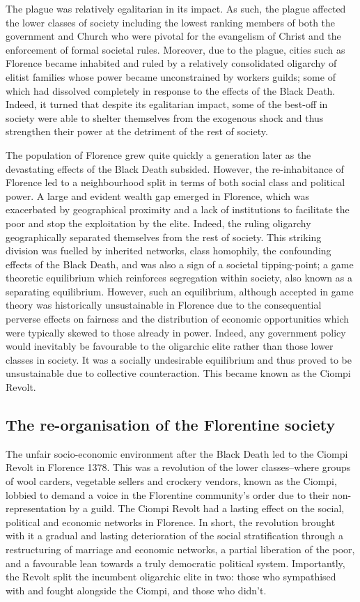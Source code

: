 The plague was relatively egalitarian in its impact. As such, the plague affected the lower classes of society including the lowest ranking members of both the government and Church who were pivotal for the evangelism of Christ and the enforcement of formal societal rules. Moreover, due to the plague, cities such as Florence became inhabited and ruled by a relatively consolidated oligarchy of elitist families whose power became unconstrained by workers guilds; some of which had dissolved completely in response to the effects of the Black Death. Indeed, it turned that despite its egalitarian impact, some of the best-off in society were able to shelter themselves from the exogenous shock and thus strengthen their power at the detriment of the rest of society.

The population of Florence grew quite quickly a generation later as the devastating effects of the Black Death subsided. However, the re-inhabitance of Florence led to a neighbourhood split in terms of both social class and political power. A large and evident wealth gap emerged in Florence, which was exacerbated by geographical proximity and a lack of institutions to facilitate the poor and stop the exploitation by the elite. Indeed, the ruling oligarchy geographically separated themselves from the rest of society. This striking division was fuelled by inherited networks, class homophily, the confounding effects of the Black Death, and was also a sign of a societal tipping-point; a game theoretic equilibrium which reinforces segregation within society, also known as a separating equilibrium. However, such an equilibrium, although accepted in game theory was historically unsustainable in Florence due to the consequential perverse effects on fairness and the distribution of economic opportunities which were typically skewed to those already in power. Indeed, any government policy would inevitably be favourable to the oligarchic elite rather than those lower classes in society. It was a socially undesirable equilibrium and thus proved to be unsustainable due to collective counteraction. This became known as the Ciompi Revolt.

\subsection{The re-organisation of the Florentine society}

The unfair socio-economic environment after the Black Death led to the Ciompi Revolt in Florence 1378. This was a revolution of the lower classes--where groups of wool carders, vegetable sellers and crockery vendors, known as the Ciompi, lobbied to demand a voice in the Florentine community's order due to their non-representation by a guild. The Ciompi Revolt had a lasting effect on the social, political and economic networks in Florence. In short, the revolution brought with it a gradual and lasting deterioration of the social stratification through a restructuring of marriage and economic networks, a partial liberation of the poor, and a favourable lean towards a truly democratic political system. Importantly, the Revolt split the incumbent oligarchic elite in two: those who sympathised with and fought alongside the Ciompi, and those who didn't.

